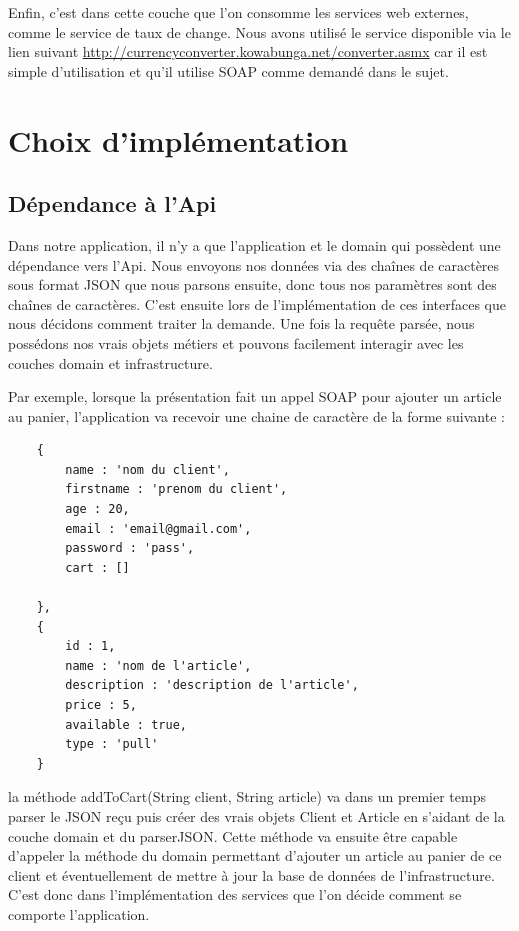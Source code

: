 \documentclass[a4paper]{article}
\begin{document}
    \bigskip
    
    Enfin, c'est dans cette couche que l'on consomme les services web externes, comme le service de taux de change. Nous avons utilisé le service disponible via le lien suivant \url{http://currencyconverter.kowabunga.net/converter.asmx} car il est simple d'utilisation et qu'il utilise SOAP comme demandé dans le sujet.

\section{Choix d'implémentation}
\subsection{Dépendance à l'Api}
    Dans notre application, il n'y a que l'application et le domain qui possèdent une dépendance vers l'Api. Nous envoyons nos données via des chaînes de caractères sous format JSON que nous parsons ensuite, donc tous nos paramètres sont des chaînes de caractères. C'est ensuite lors de l'implémentation de ces interfaces que nous décidons comment traiter la demande. Une fois la requête parsée, nous possédons nos vrais objets métiers et pouvons facilement interagir avec les couches domain et infrastructure. 
    
    \bigskip
    
    Par exemple, lorsque la présentation fait un appel SOAP pour ajouter un article au panier, l'application va recevoir une chaine de caractère de la forme suivante :
    
    \begin{lstlisting}
    {
        name : 'nom du client',
        firstname : 'prenom du client',
        age : 20,
        email : 'email@gmail.com',
        password : 'pass',
        cart : []
    
    },
    {
        id : 1,
        name : 'nom de l'article',
        description : 'description de l'article',
        price : 5,
        available : true,
        type : 'pull'
    }
    \end{lstlisting}
    
    \bigskip
    
    la méthode addToCart(String client, String article) va dans un premier temps parser le JSON reçu puis créer des vrais objets Client et Article en s'aidant de la couche domain et du parserJSON. Cette méthode va ensuite être capable d'appeler la méthode du domain permettant d'ajouter un article au panier de ce client et éventuellement de mettre à jour la base de données de l'infrastructure. C'est donc dans l'implémentation des services que l'on décide comment se comporte l'application.
\end{document}
